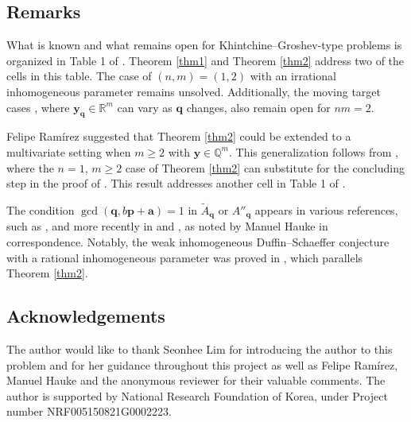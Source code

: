 \documentclass[reqno]{amsart}
\theoremstyle{definition}
\theoremstyle{remark}
\begin{document}
\subsection*{Remarks}
What is known and what remains open for Khintchine--Groshev-type problems is organized in Table 1 of \cite{HR24}. Theorem \ref{thm1} and Theorem \ref{thm2} address two of the cells in this table. The case of $(n,m)=(1,2)$ with an irrational inhomogeneous parameter remains unsolved. Additionally, the moving target cases \cite[Conjecture 2]{AR22}, where $\mathbf{y_\mathbf{q}} \in \mathbb{R}^m$ can vary as $\mathbf{q}$ changes, also remain open for $nm=2$.

Felipe Ramírez suggested that Theorem \ref{thm2} could be extended to a multivariate setting when $m\geq2$ with $\mathbf{y} \in \mathbb{Q}^m$. This generalization follows from \cite[Theorem 2.3]{Ram24}, where the $n=1$, $m \geq 2$ case of Theorem \ref{thm2} can substitute for the concluding step in the proof of \cite[Theorem 2.3]{Ram24}. This result addresses another cell in Table 1 of \cite{HR24}.

The condition $\gcd(\mathbf{q}, b\mathbf{p} + \mathbf{a}) = 1$ in $\tilde{A}_\mathbf{q}$ or $A''_\mathbf{q}$ appears in various references, such as \cite{Sch64}, and more recently in \cite{BHV24} and \cite{CT24}, as noted by Manuel Hauke in correspondence. Notably, the weak inhomogeneous Duffin--Schaeffer conjecture with a rational inhomogeneous parameter was proved in \cite{BHV24}, which parallels Theorem \ref{thm2}. 


\subsection*{Acknowledgements}
The author would like to thank Seonhee Lim for introducing the author to this problem and for her guidance throughout this project as well as Felipe Ramírez, Manuel Hauke and the anonymous reviewer for their valuable comments. The author is supported by National Research Foundation of Korea, under Project number NRF005150821G0002223.

\vspace{.1cm}
\end{document}
